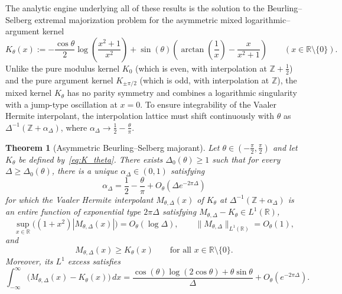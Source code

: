 \documentclass[11pt,a4paper]{amsart}
\newtheorem{theorem}{Theorem}[section]
\theoremstyle{remark}
\numberwithin{equation}{section}
\newcommand{\R}{\mathbb{R}}
\newcommand{\Z}{\mathbb{Z}}
\begin{document}
The analytic engine underlying all of these results is the solution to the Beurling--Selberg extremal majorization problem for the asymmetric mixed logarithmic--argument kernel
\begin{equation}\label{eq:K_theta}
  K_\theta(x) := -\frac{\cos\theta}{2}\log\!\left(\frac{x^2+1}{x^2}\right) + \sin(\theta)\left(\arctan\!\left(\frac{1}{x}\right) - \frac{x}{x^2+1}\right)
  \qquad (x \in \R\setminus\{0\}).
\end{equation}
Unlike the pure modulus kernel $K_0$ (which is even, with interpolation at $\Z+\frac{1}{2}$) and the pure argument kernel $K_{\pm\pi/2}$ (which is odd, with interpolation at $\Z$), the mixed kernel $K_\theta$ has no parity symmetry and combines a logarithmic singularity with a jump-type oscillation at $x = 0$. To ensure integrability of the Vaaler Hermite interpolant, the interpolation lattice must shift continuously with $\theta$ as $\Delta^{-1}(\Z + \alpha_\Delta)$, where $\alpha_\Delta \to \frac{1}{2} - \frac{\theta}{\pi}$.

\begin{theorem}[Asymmetric Beurling--Selberg majorant]\label{thm:majorant}
Let $\theta \in (-\frac{\pi}{2},\frac{\pi}{2})$ and let $K_\theta$ be defined by~\eqref{eq:K_theta}. There exists $\Delta_0(\theta) \ge 1$ such that for every $\Delta \ge \Delta_0(\theta)$, there is a unique $\alpha_\Delta \in (0,1)$ satisfying
\[
  \alpha_\Delta = \frac{1}{2} - \frac{\theta}{\pi} + O_\theta\!\left(\Delta e^{-2\pi\Delta}\right)
\]
for which the Vaaler Hermite interpolant $M_{\theta,\Delta}(x)$ of $K_\theta$ at $\Delta^{-1}(\Z + \alpha_\Delta)$ is an entire function of exponential type $2\pi\Delta$ satisfying $M_{\theta,\Delta} - K_\theta \in L^1(\R)$,
\[
  \sup_{x \in \R}\bigl((1+x^2)|M_{\theta,\Delta}(x)|\bigr) = O_\theta(\log\Delta),
  \qquad
  \|M_{\theta,\Delta}\|_{L^1(\R)} = O_\theta(1),
\]
and
\[
  M_{\theta,\Delta}(x) \ge K_\theta(x) \qquad \text{for all } x \in \R\setminus\{0\}.
\]
Moreover, its $L^1$ excess satisfies
\begin{equation}\label{eq:L1_excess}
  \int_{-\infty}^\infty \bigl(M_{\theta,\Delta}(x) - K_\theta(x)\bigr)\,dx
  = \frac{\cos(\theta)\log(2\cos\theta) + \theta\sin\theta}{\Delta} + O_\theta\!\left(e^{-2\pi\Delta}\right).
\end{equation}
\end{theorem}
\end{document}
